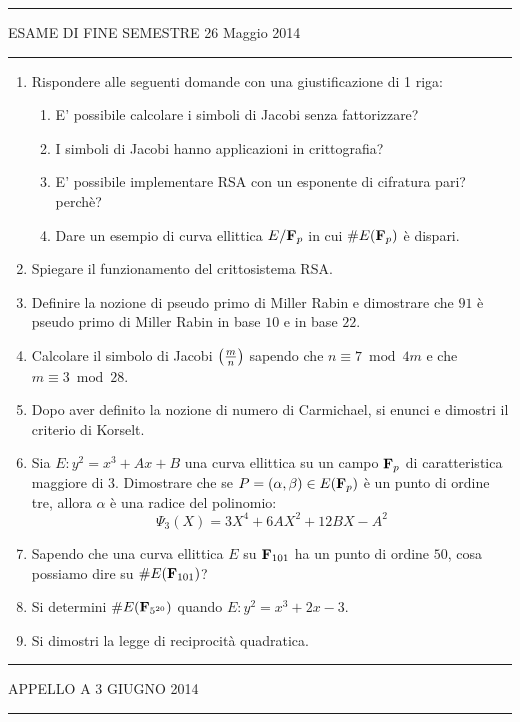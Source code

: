 \documentclass[a4paper,12pt]{article}
\begin{document}
\hrule\smallskip

\noindent ESAME DI FINE SEMESTRE \hfill 26 Maggio 2014 

\hrule\smallskip

\begin{enumerate}
\item Rispondere alle seguenti domande con una giustificazione di 1 riga:
\begin{enumerate}
\item E' possibile calcolare i simboli di Jacobi senza fattorizzare?
\item I simboli di Jacobi hanno applicazioni in crittografia?
\item E' possibile implementare RSA con un esponente di cifratura pari? perch\`e?
\item Dare un esempio di curva ellittica $E/{\bf F}_p$ in cui $\#E({\bf F}_p)$ \`e dispari.
\end{enumerate}
\item Spiegare il funzionamento del crittosistema RSA. 
\item Definire la nozione di pseudo primo di Miller Rabin e dimostrare che $91$ \`e pseudo primo di Miller Rabin in base $10$ e in base $22$.
\item Calcolare il simbolo di Jacobi $\left({m\over n}\right)$ sapendo che $n\equiv 7\bmod 4m$ e che $m\equiv 3\bmod 28$.
\item Dopo aver definito la nozione di numero di Carmichael, si enunci e dimostri il criterio di Korselt.
\item Sia $E: y^2=x^3+Ax+B$ una curva ellittica su un campo ${\bf F}_p$ di caratteristica maggiore di $3$. 
Dimostrare che se $P=(\alpha,\beta)\in E({\bf F}_p)$ \`e un punto di ordine tre, allora $\alpha$ \`e una radice del polinomio:
$$\Psi_3(X)=3X^4+6AX^2+12BX-A^2$$
\item Sapendo che una curva ellittica $E$ su ${\bf F}_{101}$ ha un punto di ordine $50$, cosa possiamo dire su $\#E({\bf F}_{101})$?
\item Si determini $\#E({\bf F}_{5^{20}})$ quando $E: y^2=x^3+2x-3$.
\item Si dimostri la legge di reciprocit\`a quadratica.
\end{enumerate}

\hrule\smallskip

\noindent APPELLO A \hfill 3 GIUGNO 2014

\hrule\smallskip
\end{document}
